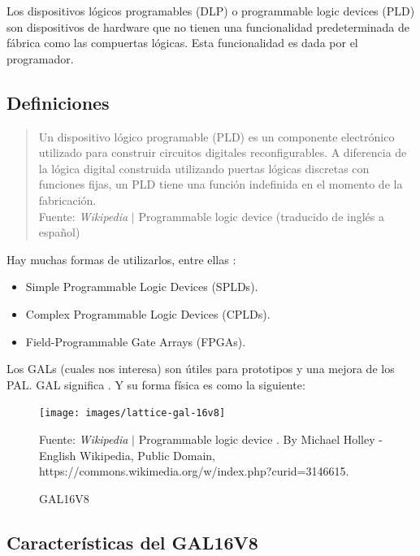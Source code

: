 \documentclass{article}
\begin{document}
    Los dispositivos lógicos programables (DLP) o programmable logic devices
    (PLD) son dispositivos de hardware que no tienen una funcionalidad
    predeterminada de fábrica como las compuertas lógicas. Esta funcionalidad
    es dada por el programador.

    \subsection{Definiciones}

    \begin{quote}
        Un dispositivo lógico programable (PLD) es un componente electrónico
        utilizado para construir circuitos digitales reconfigurables. A
        diferencia de la lógica digital construida utilizando puertas lógicas
        discretas con funciones fijas, un PLD tiene una función indefinida en
        el momento de la fabricación.\\ \footnotesize
        Fuente: \textit{Wikipedia} $\mid$ Programmable logic device
        \cite{wikipedia-pld-2022} (traducido de inglés a español)
    \end{quote}

    Hay muchas formas de utilizarlos, entre ellas \cite{wikipedia-pld-2022}:

    \begin{itemize}
        \item Simple Programmable Logic Devices (SPLDs).
        \item Complex Programmable Logic Devices (CPLDs).
        \item Field-Programmable Gate Arrays (FPGAs).
    \end{itemize}

    Los GALs (cuales nos interesa) son útiles para prototipos y una mejora de
    los PAL. GAL significa . Y
    su forma física es como la siguiente:

    \begin{figure}[H]
        \centering
        \texttt{[image: images/lattice-gal-16v8]}
        \caption{GAL16V8}\footnotesize
        Fuente: \textit{Wikipedia} $\mid$  Programmable logic device
        \cite{wikipedia-pld-2022}. By Michael Holley - English Wikipedia,
        Public Domain, https://commons.wikimedia.org/w/index.php?curid=3146615.
    \end{figure}

    \subsection{Características del GAL16V8}
\end{document}
